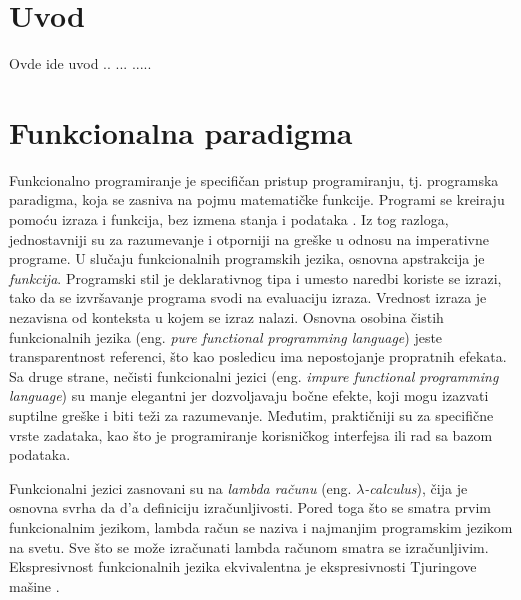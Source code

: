 \documentclass[12pt,oneside]{memoir}
\begin{document}
\frontmatter
\naslovna
\komisija
\apstrakt
\tableofcontents*

\mainmatter

\chapter{Uvod}

Ovde ide uvod .. ... ..... 

\chapter{Funkcionalna paradigma}
\label{chp:uvodnideo}

\par Funkcionalno programiranje je specifičan pristup programiranju, tj. programska paradigma, koja se zasniva na pojmu matematičke funkcije. Programi se kreiraju pomoću izraza i funkcija, bez izmena stanja i podataka \cite{func}. Iz tog razloga, jednostavniji su za razumevanje i otporniji na greške u odnosu na imperativne programe. U slučaju funkcionalnih programskih jezika, osnovna apstrakcija je \textit{funkcija}. Programski stil je deklarativnog tipa i umesto naredbi koriste se izrazi, tako da se izvršavanje programa svodi na evaluaciju izraza. Vrednost izraza je nezavisna od konteksta u kojem se izraz nalazi. Osnovna osobina čistih funkcionalnih jezika (eng. \textit{pure functional programming language}) jeste transparentnost referenci, što kao posledicu ima nepostojanje propratnih efekata. Sa druge strane, nečisti funkcionalni jezici (eng. \textit{impure functional programming language}) su manje elegantni jer dozvoljavaju bočne efekte, koji mogu izazvati suptilne greške i biti teži za razumevanje. Međutim, praktičniji su za specifične vrste zadataka, kao što je programiranje korisničkog interfejsa ili rad sa bazom podataka. 
\par Funkcionalni jezici zasnovani su na \textit{lambda računu} (eng. \textit{$\lambda$-calculus}), čija je osnovna svrha da d\a'a  definiciju izračunljivosti. Pored toga što se smatra prvim funkcionalnim jezikom, lambda račun se naziva i najmanjim programskim jezikom na svetu. Sve što se može izračunati lambda računom smatra se izračunljivim. Ekspresivnost funkcionalnih jezika ekvivalentna je ekspresivnosti Tjuringove mašine \cite{turing}. 
\end{document}
